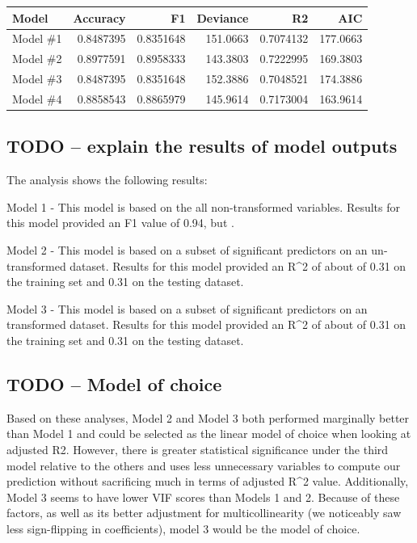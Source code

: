 \documentclass[
]{article}
\begin{document}
\begin{table}[H]
\centering
\begin{tabular}{l|r|r|r|r|r}
\hline
Model & Accuracy & F1 & Deviance & R2 & AIC\\
\hline
Model \#1 & 0.8487395 & 0.8351648 & 151.0663 & 0.7074132 & 177.0663\\
\hline
Model \#2 & 0.8977591 & 0.8958333 & 143.3803 & 0.7222995 & 169.3803\\
\hline
Model \#3 & 0.8487395 & 0.8351648 & 152.3886 & 0.7048521 & 174.3886\\
\hline
Model \#4 & 0.8858543 & 0.8865979 & 145.9614 & 0.7173004 & 163.9614\\
\hline
\end{tabular}
\end{table}

\hypertarget{todo-explain-the-results-of-model-outputs}{%
\subsection{TODO -- explain the results of model
outputs}\label{todo-explain-the-results-of-model-outputs}}

The analysis shows the following results:

Model 1 - This model is based on the all non-transformed variables.
Results for this model provided an F1 value of 0.94, but .

Model 2 - This model is based on a subset of significant predictors on
an un-transformed dataset. Results for this model provided an R\^{}2 of
about of 0.31 on the training set and 0.31 on the testing dataset.

Model 3 - This model is based on a subset of significant predictors on
an transformed dataset. Results for this model provided an R\^{}2 of
about of 0.31 on the training set and 0.31 on the testing dataset.

\hypertarget{todo-model-of-choice}{%
\subsection{TODO -- Model of choice}\label{todo-model-of-choice}}

Based on these analyses, Model 2 and Model 3 both performed marginally
better than Model 1 and could be selected as the linear model of choice
when looking at adjusted R2. However, there is greater statistical
significance under the third model relative to the others and uses less
unnecessary variables to compute our prediction without sacrificing much
in terms of adjusted R\^{}2 value. Additionally, Model 3 seems to have
lower VIF scores than Models 1 and 2. Because of these factors, as well
as its better adjustment for multicollinearity (we noticeably saw less
sign-flipping in coefficients), model 3 would be the model of choice.
\end{document}
